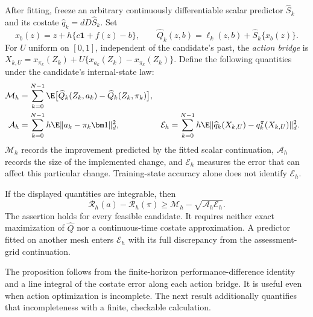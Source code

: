 After fitting, freeze an arbitrary continuously differentiable scalar
predictor $\widehat S_k$ and its costate $\widehat q_k=dD\widehat S_k$.
Set
\[
 x_b(z)=z+h\{c\bm1+f(z)-b\},\qquad
 \widehat Q_k(z,b)=\ell_k(z,b)+\widehat S_k\{x_b(z)\}.
\]
For $U$ uniform on $[0,1]$, independent of the candidate's past, the
\emph{action bridge} is
$X_{k,U}=x_{\pi_k}(Z_k)+U\{x_{a_k}(Z_k)-x_{\pi_k}(Z_k)\}$.
Define the following quantities under the candidate's internal-state law:
\begin{align}
 \mathcal M_h&=\sum_{k=0}^{N-1}\E\big[
       \widehat Q_k(Z_k,a_k)-\widehat Q_k(Z_k,\pi_k)\big],\notag\\
 \mathcal A_h&=\sum_{k=0}^{N-1}h\E\|a_k-\pi_k\bm1\|_d^2,
 &\mathcal E_h&=\sum_{k=0}^{N-1}h\E
       \|\widehat q_k(X_{k,U})-q_k^\pi(X_{k,U})\|_d^2.
 \label{eq:r15accounts}
\end{align}
$\mathcal M_h$ records the improvement predicted by the fitted scalar
continuation, $\mathcal A_h$ records the size of the implemented change,
and $\mathcal E_h$ measures the error that can affect this particular
change. Training-state accuracy alone does not identify $\mathcal E_h$.

\begin{proposition}
\label{prop:r15bellmanbridge}
If the displayed quantities are integrable, then
\begin{equation}
 \mathcal R_h(a)-\mathcal R_h(\pi)
       \geq\mathcal M_h-\sqrt{\mathcal A_h\mathcal E_h}.
 \label{eq:r15bridge}
\end{equation}
The assertion holds for every feasible candidate. It requires neither
exact maximization of $\widehat Q$ nor a continuous-time costate
approximation. A predictor fitted on another mesh enters
$\mathcal E_h$ with its full discrepancy from the assessment-grid
continuation.
\end{proposition}

The proposition follows from the finite-horizon performance-difference
identity and a line integral of the costate error along each action
bridge. It is useful even when action optimization is incomplete. The
next result additionally quantifies that incompleteness with a finite,
checkable calculation.

